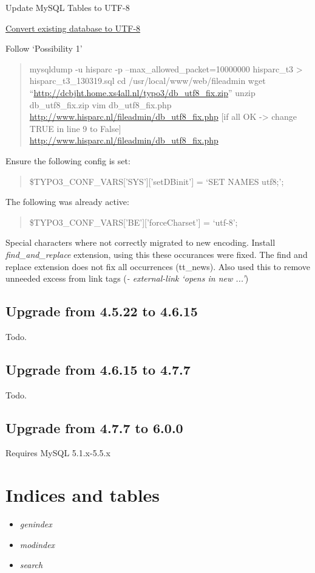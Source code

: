 \documentclass[a4paper,11pt,english]{sphinxmanual}
\begin{document}
Update MySQL Tables to UTF-8

\href{http://wiki.typo3.org/UTF-8\_support\#Convert\_an\_already\_existing\_database\_to\_UTF-8}{Convert existing database to UTF-8}

Follow `Possibility 1'
\begin{quote}

mysqldump -u hisparc -p --max\_allowed\_packet=10000000 hisparc\_t3 \textgreater{} hisparc\_t3\_130319.sql
cd /usr/local/www/web/fileadmin
wget ``\href{http://dcbjht.home.xs4all.nl/typo3/db\_utf8\_fix.zip}{http://dcbjht.home.xs4all.nl/typo3/db\_utf8\_fix.zip}''
unzip db\_utf8\_fix.zip
vim  db\_utf8\_fix.php
\href{http://www.hisparc.nl/fileadmin/db\_utf8\_fix.php}{http://www.hisparc.nl/fileadmin/db\_utf8\_fix.php}
{[}if all OK -\textgreater{} change TRUE in line 9 to False{]}
\href{http://www.hisparc.nl/fileadmin/db\_utf8\_fix.php}{http://www.hisparc.nl/fileadmin/db\_utf8\_fix.php}
\end{quote}

Ensure the following config is set:
\begin{quote}

\$TYPO3\_CONF\_VARS{[}'SYS'{]}{[}'setDBinit'{]} = `SET NAMES utf8;';
\end{quote}

The following was already active:
\begin{quote}

\$TYPO3\_CONF\_VARS{[}'BE'{]}{[}'forceCharset'{]} = `utf-8';
\end{quote}

Special characters where not correctly migrated to new encoding.
Install \emph{find\_and\_replace} extension, using this these occurances were fixed.
The find and replace extension does not fix all occurrences (tt\_news).
Also used this to remove unneeded excess from link tags (\emph{- external-link `opens in new ...'})


\section{Upgrade from 4.5.22 to 4.6.15}
\label{typo3:upgrade-from-4-5-22-to-4-6-15}
Todo.


\section{Upgrade from 4.6.15 to 4.7.7}
\label{typo3:upgrade-from-4-6-15-to-4-7-7}
Todo.


\section{Upgrade from 4.7.7 to 6.0.0}
\label{typo3:upgrade-from-4-7-7-to-6-0-0}
Requires MySQL 5.1.x-5.5.x


\chapter{Indices and tables}
\label{index:indices-and-tables}\begin{itemize}
\item {} 
\emph{genindex}

\item {} 
\emph{modindex}

\item {} 
\emph{search}

\end{itemize}



\renewcommand{\indexname}{Index}
\printindex
\end{document}
